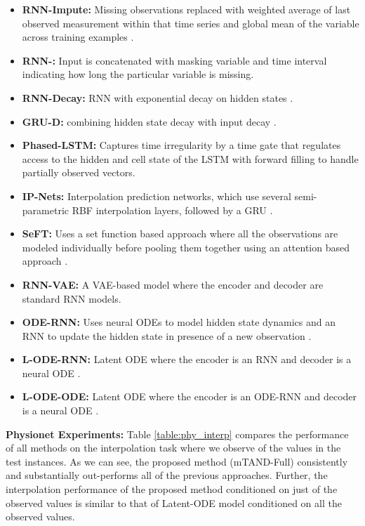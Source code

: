 \documentclass{article} \usepackage{iclr2021_conference,times}
\begin{document}
\begin{itemize}[leftmargin=*]
     \item \textbf{RNN-Impute:} Missing observations replaced with weighted average of last observed measurement within that time series and global mean of the variable across training examples \citep{che2016recurrent}.
     \item \textbf{RNN-:} Input is concatenated with masking variable and time interval  indicating how long the particular variable is missing.
     \item \textbf{RNN-Decay:} RNN with exponential decay on hidden states \citep{mozer2017,che2016recurrent}.
     \item \textbf{GRU-D:} combining hidden state decay with input decay \citep{che2016recurrent}.
     \item \textbf{Phased-LSTM:} Captures time irregularity by a time gate that regulates access to the hidden and cell state of the LSTM \citep{phased2016} with forward filling to handle partially observed vectors. 
     \item \textbf{IP-Nets:} Interpolation prediction networks, which use several semi-parametric RBF interpolation layers, followed by a GRU \citep{shukla2019}.
     \item \textbf{SeFT:} Uses a set function based approach where all the observations are modeled individually before pooling them together using an attention based approach \citep{seft}.
     \item \textbf{RNN-VAE:} A VAE-based model where the encoder and decoder are standard RNN models. 
     \item \textbf{ODE-RNN:} Uses neural ODEs to model hidden state dynamics and an RNN to update the hidden state in presence of a new observation \citep{Rubanova2019}.
    \item \textbf{L-ODE-RNN:}  Latent ODE where the encoder is an RNN and decoder is a neural ODE \citep{neural_ode2018}. 
    \item \textbf{L-ODE-ODE:} Latent ODE where the encoder is an ODE-RNN and decoder is a neural ODE \citep{Rubanova2019}.
\end{itemize}

\textbf{Physionet Experiments:}
Table \ref{table:phy_interp} compares the performance of all methods on the interpolation task where we observe  of the values in the test instances.
As we can see, the proposed method (mTAND-Full) consistently and substantially out-performs all of the previous approaches. Further, the interpolation performance of the proposed method conditioned on just  of the observed values  is similar to that of Latent-ODE model conditioned on all the observed values. 
\end{document}
